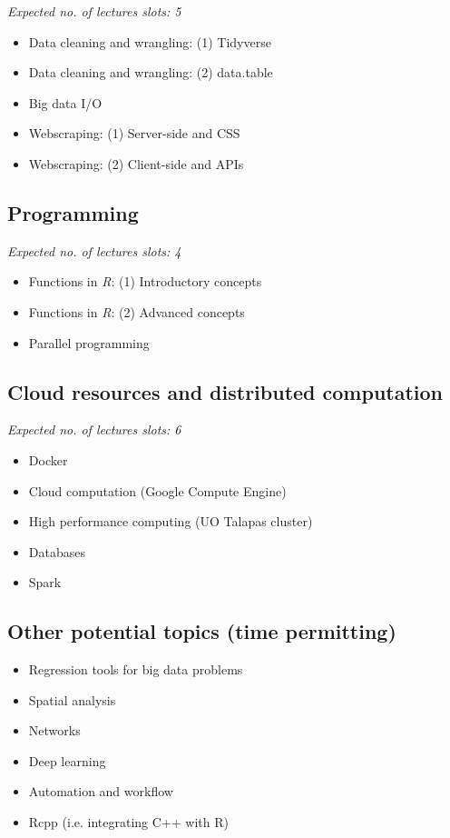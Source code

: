 \documentclass[12]{article}
\begin{document}
\textit{Expected no. of lectures slots: 5}

\begin{itemize}
	\item Data cleaning and wrangling: (1) Tidyverse
	\item Data cleaning and wrangling: (2) data.table
	\item Big data I/O
	\item Webscraping: (1) Server-side and CSS
	\item Webscraping: (2) Client-side and APIs
\end{itemize}


\subsection*{Programming}

\textit{Expected no. of lectures slots: 4}

\begin{itemize}
	\item Functions in \textit{R}: (1) Introductory concepts
	\item Functions in \textit{R}: (2) Advanced concepts
	\item Parallel programming
\end{itemize}

\subsection*{Cloud resources and distributed computation}

\textit{Expected no. of lectures slots: 6}

\begin{itemize}
	\item Docker
	\item Cloud computation (Google Compute Engine)
	\item High performance computing (UO Talapas cluster) 
	\item Databases
	\item Spark
\end{itemize}


\subsection*{Other potential topics (time permitting)}

\begin{itemize}
	\item Regression tools for big data problems
	\item Spatial analysis
	\item Networks
	\item Deep learning
	\item Automation and workflow
	\item Rcpp (i.e. integrating C++ with R)
\end{itemize}
\end{document}
